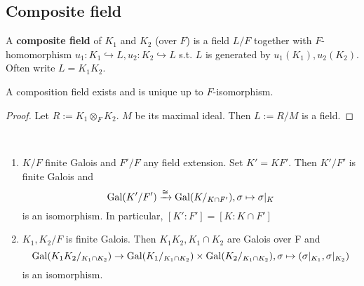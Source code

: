 \subsection{Composite field}
\begin{definition}
    A \textbf{composite field} of  $ K_1  $ and  $ K_2  $ (over  $ F  $) is a field  $ L/F  $ together with  $ F $-homomorphism  $ u_1:K_1\hookrightarrow L,u_2:K_2\hookrightarrow L$ s.t.  $ L  $ is generated by  $ u_1(K_1),u_2(K_2) $.\\
    Often write  $ L=K_1K_2 $.   
\end{definition}
\begin{theorem}
    A composition field exists and is unique up to  $ F  $-isomorphism.
\end{theorem}
\begin{proof}
    Let  $ R:=K_1\otimes_F K_2  $.  $ M  $ be its maximal ideal. Then $ L:=R/M  $ is a field.
\end{proof}
\begin{theorem}
    \,\begin{enumerate}[(1)]
        \item  $ K/F  $ finite Galois and  $ F'/F  $ any field extension. Set  $ K'=KF'  $. Then  $ K'/F'  $ is finite Galois and 
        \[\operatorname{Gal}(K'/F')\xrightarrow{\cong}\operatorname{Gal}(K/_{K\cap F'}),\sigma\mapsto \sigma|_K\]
        is an isomorphism. In particular,  $ [K':F']=[K:K\cap F'] $
        \item  $ K_1,K_2/F  $ is finite Galois. Then  $ K_1K_2,K_1\cap K_2 $ are Galois over F and 
         \[\operatorname{Gal}(K_1K_2/_{K_1\cap K_2})\rightarrow \operatorname{Gal}(K_1/_{K_1\cap K_2})\times \operatorname{Gal}(K_2/_{K_1\cap K_2}),\sigma\mapsto (\sigma|_{K_1},\sigma|_{K_2})\] 
         is an isomorphism. 
    \end{enumerate}
\end{theorem}
